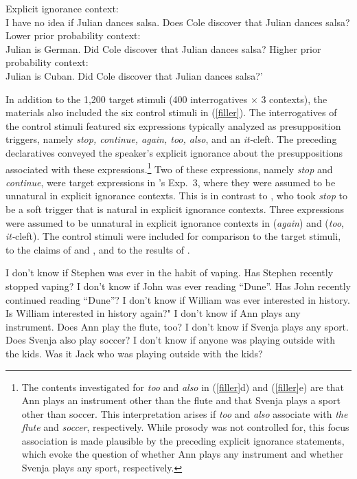 \documentclass[11pt,fleqn]{article}
\newcommand{\6}{\mbox{$[\hspace*{-.6mm}[$}}
\newcommand{\9}{\mbox{$]\hspace*{-.6mm}]$}}
\newcommand{\citepos}[1]{\citeauthor{#1}'s \citeyear{#1}}
\begin{document}
\begin{exe}
\ex\label{sample}
\begin{xlist}
\ex Explicit ignorance context: \\ I have no idea if Julian dances salsa. Does Cole discover that Julian dances salsa?
\ex Lower prior probability context: \\ Julian is German. Did Cole discover that Julian dances salsa?
\ex Higher prior probability context: \\ Julian is Cuban. Did Cole discover that Julian dances salsa?'
\end{xlist}
\end{exe}

In addition to the 1,200 target stimuli (400 interrogatives $\times$ 3 contexts), the materials also included the six control stimuli in (\ref{filler}). The interrogatives of the control stimuli featured six expressions typically analyzed as presupposition triggers, namely {\em stop, continue, again, too, also}, and an {\em it-}cleft. The preceding declaratives conveyed the speaker's explicit ignorance about the presuppositions associated with these expressions.\footnote{The contents investigated for {\em too} and {\em also} in (\ref{filler}d) and (\ref{filler}e) are that Ann plays an instrument other than the flute and that Svenja plays a sport other than soccer. This interpretation arises if {\em too} and {\em also} associate with {\em the flute} and {\em soccer}, respectively. While prosody was not controlled for, this focus association is made plausible by the preceding explicit ignorance statements, which evoke the question of whether Ann plays any instrument and whether Svenja plays any sport, respectively.} Two of these expressions, namely {\em stop} and {\em continue}, were target expressions in \citepos{mandelkern-etal2020} Exp.~3, where they were assumed to be unnatural in explicit ignorance contexts. This is in contrast to \citealt{simons01}, who took {\em stop} to be a soft trigger that is natural in explicit ignorance contexts. Three expressions were assumed to be unnatural in explicit ignorance contexts in \citealt{simons01} ({\em again}) and \citealt{abusch10} ({\em too}, {\em it-}cleft). The control stimuli were included for comparison to the target stimuli, to the claims of \citealt{simons01} and \citealt{abusch10}, and to the results of \citealt{mandelkern-etal2020}.

\begin{exe}
\ex\label{filler} 
\begin{xlist}
\ex I don't know if Stephen was ever in the habit of vaping. Has Stephen recently stopped vaping?
\ex I don't know if John was ever reading ``Dune''. Has John recently continued reading ``Dune''?
\ex I don't know if William was ever interested in history. Is William interested in history again?"
\ex I don't know if Ann plays any instrument. Does Ann play the flute, too?
\ex I don't know if Svenja plays any sport. Does Svenja also play soccer?
\ex I don't know if anyone was playing outside with the kids. Was it Jack who was playing outside with the kids?

\end{xlist}
\end{exe}
\end{document}
